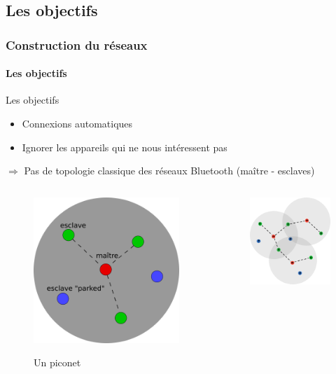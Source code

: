 \documentclass{beamer}
\begin{document}
    \subsection{Les objectifs}
    \begin{frame}
      \frametitle{Construction du réseaux}
      \framesubtitle{Les objectifs}
      \begin{small}
        \begin{block}{Les objectifs}
          \begin{itemize}
            \item Connexions automatiques
            \item Ignorer les appareils qui ne nous intéressent pas
          \end{itemize}
          $ \Rightarrow $ Pas de topologie classique des réseaux Bluetooth (maître - esclaves)
          \begin{columns}
            \begin{column}{.5\textwidth}
              \begin{figure}
                \begin{center}
                  \includegraphics[width=.4\textwidth]{images/BluetoothPiconet.png}
                  \label{fig:piconet}
                  \caption{Un piconet}
                \end{center}
              \end{figure}
            \end{column}
            \begin{column}{.5\textwidth}
              \begin{figure}
                \begin{center}
                  \includegraphics[width=.4\textwidth]{images/BluetoothScatternet.png}

\end{center}
\end{figure}
\end{column}
\end{columns}
\end{block}
\end{small}
\end{frame}
\end{document}
